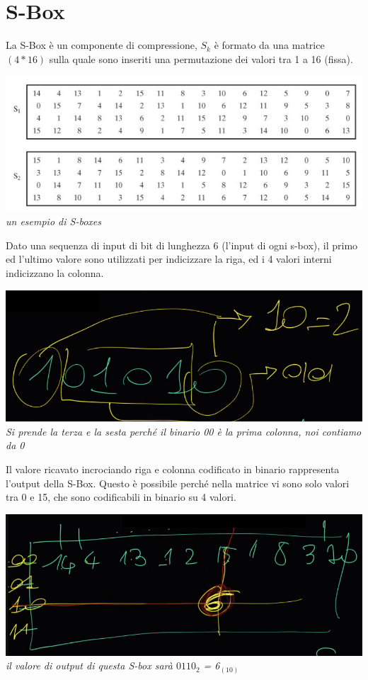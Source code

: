 \documentclass[11pt, oneside]{article}   	%
\begin{document}
\section*{S-Box}
La S-Box è un componente di compressione, $S_k$ è formato da una matrice $(4 * 16)$ sulla quale sono inseriti una permutazione dei valori tra 1 a 16 (fissa).
\begin{center}
\includegraphics[scale= 0.7]{sbox}\\
\emph{un esempio di S-boxes}
\end{center}
Dato una sequenza di input di bit di lunghezza 6 (l'input di ogni s-box), il primo ed l'ultimo valore sono utilizzati per indicizzare la riga, ed i 4 valori interni indicizzano la colonna.
\begin{center}
\includegraphics[scale= 0.8]{sbox1}\\
\emph{Si prende la terza e la sesta perché il binario 00 è la prima colonna, noi contiamo da 0}
\end{center}
Il valore ricavato incrociando riga e colonna codificato in binario rappresenta l'output della S-Box.
Questo è possibile perché nella matrice vi sono solo valori tra 0 e 15, che sono codificabili in binario su 4 valori.
\begin{center}
\includegraphics[scale= 0.8]{sbox2}\\
\emph{il valore di output di questa S-box sarà $0110_2$ = 6$_{(10)}$}
\end{center}
\end{document}
